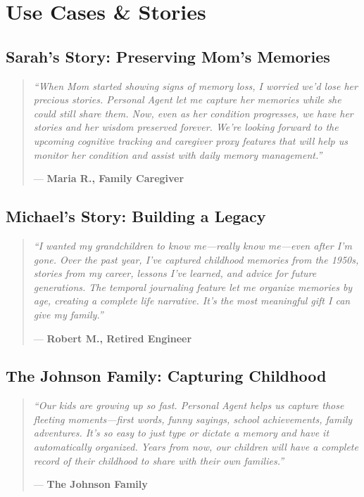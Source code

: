 \documentclass[11pt,letterpaper]{article}
\begin{document}
\newpage
\section{Use Cases \& Stories}

\subsection{Sarah's Story: Preserving Mom's Memories}

\begin{quote}
\textit{``When Mom started showing signs of memory loss, I worried we'd lose her precious stories. Personal Agent let me capture her memories while she could still share them. Now, even as her condition progresses, we have her stories and her wisdom preserved forever. We're looking forward to the upcoming cognitive tracking and caregiver proxy features that will help us monitor her condition and assist with daily memory management.''}

--- \textbf{Maria R., Family Caregiver}
\end{quote}

\subsection{Michael's Story: Building a Legacy}

\begin{quote}
\textit{``I wanted my grandchildren to know me---really know me---even after I'm gone. Over the past year, I've captured childhood memories from the 1950s, stories from my career, lessons I've learned, and advice for future generations. The temporal journaling feature let me organize memories by age, creating a complete life narrative. It's the most meaningful gift I can give my family.''}

--- \textbf{Robert M., Retired Engineer}
\end{quote}

\subsection{The Johnson Family: Capturing Childhood}

\begin{quote}
\textit{``Our kids are growing up so fast. Personal Agent helps us capture those fleeting moments---first words, funny sayings, school achievements, family adventures. It's so easy to just type or dictate a memory and have it automatically organized. Years from now, our children will have a complete record of their childhood to share with their own families.''}

--- \textbf{The Johnson Family}
\end{quote}
\end{document}
